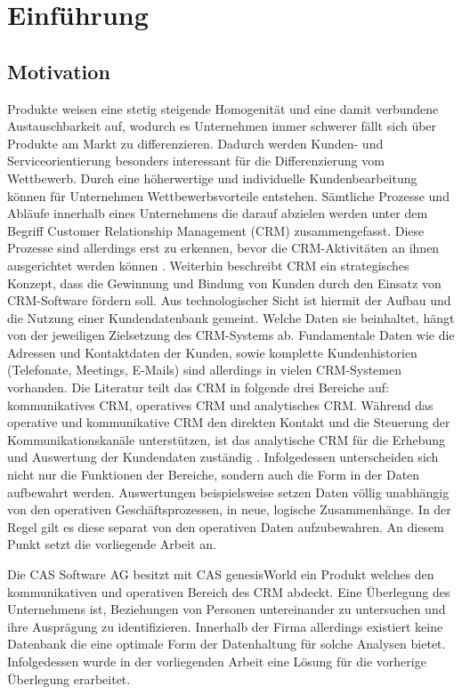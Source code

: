 \chapter{Einführung}
\label{ch:Einfuehrung}

\section{Motivation}
\label{ch:Einfuehrung:sec:Motivation}

Produkte weisen eine stetig steigende Homogenität und eine damit verbundene Austauschbarkeit auf, wodurch es Unternehmen immer schwerer fällt sich über Produkte am Markt zu differenzieren. Dadurch werden Kunden- und Serviceorientierung besonders interessant für die Differenzierung vom Wettbewerb. Durch eine höherwertige und individuelle Kundenbearbeitung können für Unternehmen Wettbewerbsvorteile entstehen. Sämtliche Prozesse und Abläufe innerhalb eines Unternehmens die darauf abzielen werden unter dem Begriff Customer Relationship Management (CRM) zusammengefasst. Diese Prozesse sind allerdings erst zu erkennen, bevor die CRM-Aktivitäten an ihnen ausgerichtet werden können \cite{SWB-1001}. Weiterhin beschreibt CRM ein strategisches Konzept, dass die Gewinnung und Bindung von Kunden durch den Einsatz von CRM-Software fördern soll. Aus technologischer Sicht ist hiermit der Aufbau und die Nutzung einer Kundendatenbank gemeint. Welche Daten sie beinhaltet, hängt von der jeweiligen Zielsetzung des CRM-Systems ab. Fundamentale Daten wie die Adressen und Kontaktdaten der Kunden, sowie komplette Kundenhistorien (Telefonate, Meetings, E-Mails) sind allerdings in vielen CRM-Systemen vorhanden. Die Literatur teilt das CRM in folgende drei Bereiche auf: kommunikatives CRM, operatives CRM und analytisches CRM. Während das operative und kommunikative CRM den direkten Kontakt und die Steuerung der Kommunikationskanäle unterstützen, ist das analytische CRM für die Erhebung und Auswertung der Kundendaten zuständig \cite{SWB-375372644}. Infolgedessen unterscheiden sich nicht nur die Funktionen der Bereiche, sondern auch die Form in der Daten aufbewahrt werden. Auswertungen beispielsweise setzen Daten völlig unabhängig von den operativen Geschäftsprozessen, in neue, logische Zusammenhänge. In der Regel gilt es diese separat von den operativen Daten aufzubewahren. An diesem Punkt setzt die vorliegende Arbeit an. 

Die CAS Software AG besitzt mit CAS genesisWorld ein Produkt welches den kommunikativen und operativen Bereich des CRM abdeckt. Eine Überlegung des Unternehmens ist, Beziehungen von Personen untereinander zu untersuchen und ihre Ausprägung zu identifizieren. Innerhalb der Firma allerdings existiert keine Datenbank die eine optimale Form der Datenhaltung für solche Analysen bietet. Infolgedessen wurde in der vorliegenden Arbeit eine Lösung für die vorherige Überlegung erarbeitet.



